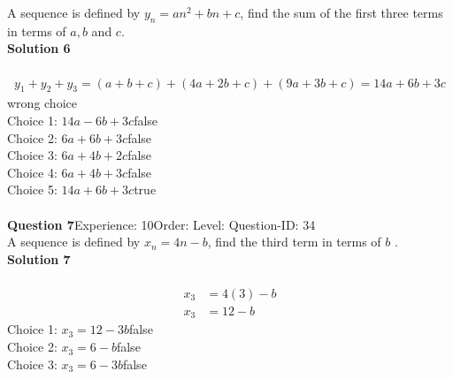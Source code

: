 \documentclass{article}
\begin{document}
A sequence is defined by $y_n=an^2+bn+c$, find the sum of the first three terms in terms of $a,b$ and $c$.\\[4pt]
\noindent\textbf{Solution 6}\\[2pt]
\\[-35pt]\begin{align*}
y_1+y_2+y_3=(a+b+c)+(4a+2b+c)+(9a+3b+c)=14a+6b+3c
\end{align*}
wrong choice\\[4pt]
Choice 1: \hspace{20pt}$14a-6b+3c$\hspace{20pt}false\\
Choice 2: \hspace{20pt}$6a+6b+3c$\hspace{20pt}false\\
Choice 3: \hspace{20pt}$6a+4b+2c$\hspace{20pt}false\\
Choice 4: \hspace{20pt}$6a+4b+3c$\hspace{20pt}false\\
Choice 5: \hspace{20pt}$14a+6b+3c$\hspace{20pt}true\\
\\[4pt]
\noindent\textbf{Question 7}\hspace{20pt}Experience: 10\hspace{20pt}Order: \hspace{20pt}Level: \hspace{20pt}Question-ID: 34\\[2pt]
A sequence is defined by $x_n=4n-b$, find the third term in terms of $b$ .\\[4pt]
\noindent\textbf{Solution 7}\\[2pt]
\\[-35pt]\begin{align*}
x_3&=4(3)-b\\
x_3&=12-b
\end{align*}
Choice 1: \hspace{20pt}$x_3=12-3b$\hspace{20pt}false\\
Choice 2: \hspace{20pt}$x_3=6-b$\hspace{20pt}false\\
Choice 3: \hspace{20pt}$x_3=6-3b$\hspace{20pt}false\\
\end{document}
